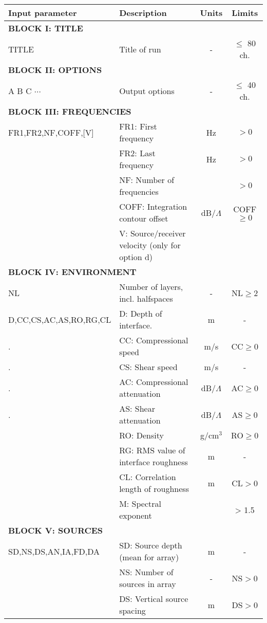 \begin{table}
\begin{center}
\small
\begin{tabular}{|l|l|c|c|}
\hline \hline
Input parameter & Description & Units & Limits \\
\hline \hline
\multicolumn{4}{|l|}{\bf BLOCK I: TITLE } \\
\hline
TITLE & Title of run  & - & $\leq$ 80 ch. \\
\hline
\multicolumn{4}{|l|}{\bf BLOCK II: OPTIONS} \\
\hline
A B C $\cdots$ & Output options & - & $\leq$ 40 ch. \\
\hline
\multicolumn{4}{|l|}{\bf BLOCK III: FREQUENCIES} \\
\hline
FR1,FR2,NF,COFF,[V] & FR1: First frequency & Hz & $>0$ \\
	& FR2: Last frequency & Hz & $>0$ \\
	& NF: Number of frequencies & & $>0$ \\
 	& COFF: Integration contour offset & dB/$\Lambda$ & COFF$\geq 0$ \\
	& V: Source/receiver velocity (only for option d) \\
\hline
\multicolumn{4}{|l|}{\bf BLOCK IV: ENVIRONMENT} \\
\hline
NL 	& Number of layers, incl. halfspaces	& - & NL$\geq 2$  \\
D,CC,CS,AC,AS,RO,RG,CL & D: Depth of interface. & m & - \\
.	& CC: Compressional speed & m/s & CC$\geq 0$ \\
.	& CS: Shear speed & m/s & - \\
.	& AC: Compressional attenuation & dB/$\Lambda$ & AC$\geq 0$ \\
.	& AS: Shear attenuation & dB/$\Lambda$ & AS$\geq 0$ \\
	& RO: Density 	& g/cm$^{3}$ & RO$\geq 0$ \\
	& RG: RMS value of interface roughness & m & - \\
	& CL: Correlation length of roughness & m & CL$>0$ \\
	& M:  Spectral exponent &   & > 1.5 \\
\hline
\multicolumn{4}{|l|}{\bf BLOCK V: SOURCES} \\
\hline
SD,NS,DS,AN,IA,FD,DA & SD: Source depth (mean for array) & m & - \\
	& NS: Number of sources in array & - &  NS$>0$ \\
	& DS: Vertical source spacing	& m & DS$>0$ \\

\end{tabular}
\end{center}
\end{table}
